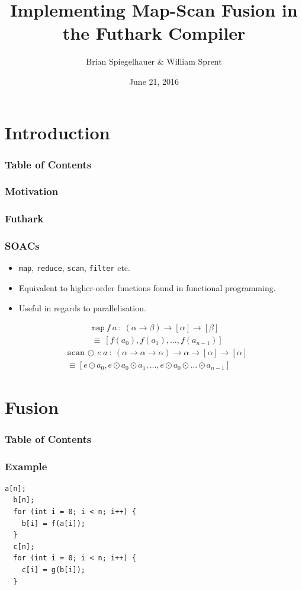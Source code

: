 \documentclass{beamer}
\title{Implementing Map-Scan Fusion in the Futhark Compiler}
\author{Brian Spiegelhauer \&  William Sprent}
\institute{DIKU \\ University of Copenhagen}
\date{June 21, 2016}
\begin{document}
\lstset{language=C, frame=single, numbers=left, breaklines=true}
\frame{\titlepage}
\section[intro]{Introduction}
\begin{frame}
\frametitle{Table of Contents}
\tableofcontents[currentsection]
\end{frame}

\begin{frame}
  \frametitle{Motivation}
\end{frame}

\begin{frame}
  \frametitle{Futhark}
\end{frame}

\begin{frame}
  \frametitle{SOACs}
  \begin{itemize}
  \item \texttt{map}, \texttt{reduce}, \texttt{scan}, \texttt{filter} etc.
  \item Equivalent to higher-order functions found in functional programming.
  \item Useful in regards to parallelisation.
  \end{itemize}
  \begin{align*}
    &\mathtt{map} \: f \: a \: :  \: (\alpha \to \beta) \to [\alpha] \to [\beta]\\
    &\equiv  \: [f(a_0), f(a_1), ..., f(a_{n-1})]
  \end{align*}
  \begin{align*}
&\mathtt{scan} \: \odot \: e \: a \: : \:(\alpha \to \alpha \to \alpha) \to \alpha \to [\alpha] \to [\alpha] \\
&\equiv [e \odot a_0, e \odot a_0 \odot a_1, ..., e \odot a_0 \odot ... \odot a_{n-1}]
\end{align*}
\end{frame}

\section[fus]{Fusion}
\begin{frame}
\frametitle{Table of Contents}
\tableofcontents[currentsection]
\end{frame}

\begin{frame}[fragile]
  \frametitle{Example}
\begin{lstlisting}[caption=Producer-Consumer pre-fusion.,label={lst:pc-pre}] 
  a[n];
  b[n];
  for (int i = 0; i < n; i++) {
    b[i] = f(a[i]);
  }
  c[n];
  for (int i = 0; i < n; i++) {
    c[i] = g(b[i]);
  }
\end{lstlisting}
\end{frame}
\end{document}
